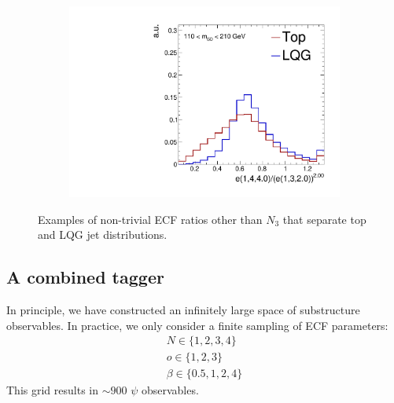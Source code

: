 \begin{figure}[]
\begin{center}
\begin{subfigure}[t]{0.32\textwidth}
            \includegraphics[width=\textwidth]{figures/toptagging/shapes/mass_ratio_14401320.pdf}
        \end{subfigure}
        \caption{Examples of non-trivial ECF ratios other than $N_3$ that separate top and LQG jet distributions.}
        \label{fig:jets:ecfrs}
    \end{center}
\end{figure}


\subsection{A combined tagger}
\label{sec:jets:bdt}

In principle, we have constructed an infinitely large space of substructure observables.
In practice, we only consider a finite sampling of ECF parameters:
\begin{gather}
    N \in \{1,2,3,4\} \nonumber \\ 
    o \in \{1,2,3\} \nonumber \\ 
    \beta \in \{0.5, 1, 2, 4\}
\end{gather}
This grid results in $\sim900$ $\psi$ observables.

